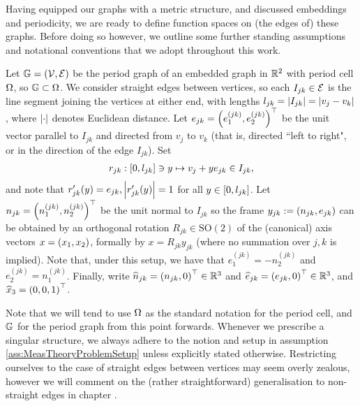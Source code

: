 Having equipped our graphs with a metric structure, and discussed embeddings and periodicity, we are ready to define function spaces on (the edges of) these graphs.
Before doing so however, we outline some further standing assumptions and notational conventions that we adopt throughout this work.
\begin{assumption} \label{ass:MeasTheoryProblemSetup}
	Let $\mathbb{G}=\left( \mathcal{V},\mathcal{E} \right)$ be the period graph of an embedded graph in $\mathbb{R}^2$ with period cell $\Omega$, so $\mathbb{G}\subset\Omega$.
	We consider straight edges between vertices, so each $I_{jk}\in \mathcal{E}$ is the line segment joining the vertices at either end, with lengths $l_{jk} = \left\lvert I_{jk} \right\rvert = \left\lvert v_j-v_k \right\rvert$, where $\left\lvert \cdot \right\rvert$ denotes Euclidean distance.
	Let $e_{jk} = \left( e_1^{(jk)}, e_2^{(jk)} \right)^\top$ be the unit vector parallel to $I_{jk}$ and directed from $v_j$ to $v_k$ (that is, directed ``left to right", or in the direction of the edge $I_{jk}$).
	Set
	\begin{align} \label{eq:EdgeParameterisation}
		r_{jk}:\left[ 0, l_{jk} \right] \ni y \mapsto v_j + ye_{jk} \in I_{jk},
	\end{align}
	and note that $r_{jk}'(y) = e_{jk}, \left\lvert r_{jk}'(y) \right\rvert=1$ for all $y\in\left[ 0, l_{jk} \right]$.
	Let $n_{jk} = \left( n_1^{(jk)}, n_2^{(jk)} \right)^\top$ be the unit normal to $I_{jk}$ so the frame $y_{jk} := \left( n_{jk}, e_{jk} \right)$ can be obtained by an orthogonal rotation $R_{jk}\in\mathrm{SO}(2)$ of the (canonical) axis vectors $x = \left( x_1, x_2 \right)$, formally by $x = R_{jk}y_{jk}$ (where no summation over $j,k$ is implied).
	Note that, under this setup, we have that $e_1^{(jk)} = - n_2^{(jk)}$ and $e_2^{(jk)} = n_1^{(jk)}$.
	Finally, write $\widehat{n}_{jk} = \left(  n_{jk}, 0  \right)^\top\in\mathbb{R}^3$ and $\widehat{e}_{jk} = \left(  e_{jk}, 0  \right)^\top\in\mathbb{R}^3$, and $\widehat{x}_3 = \left( 0,0,1 \right)^\top$.
\end{assumption}
Note that we will tend to use $\Omega$ as the standard notation for the period cell, and $\mathbb{G}$ for the period graph from this point forwards. 
Whenever we prescribe a singular structure, we always adhere to the notion and setup in assumption \ref{ass:MeasTheoryProblemSetup} unless explicitly stated otherwise.
Restricting ourselves to the case of straight edges between vertices may seem overly zealous, however we will comment on the (rather straightforward) generalisation to non-straight edges in chapter .

